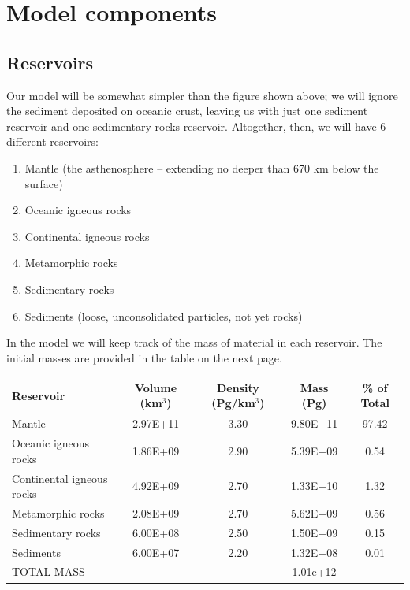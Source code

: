 \documentclass[11pt,letterpaper]{article}
\begin{document}
\section{Model components}
\subsection{Reservoirs}
Our model will be somewhat simpler than the figure shown above; we will ignore the sediment deposited on oceanic crust, leaving us with just one sediment reservoir and one sedimentary rocks reservoir. Altogether, then, we will have 6 different reservoirs:
\begin{enumerate}
\item Mantle (the asthenosphere -- extending no deeper than 670 km below the surface)
\item Oceanic igneous rocks
\item Continental igneous rocks
\item Metamorphic rocks
\item Sedimentary rocks
\item Sediments (loose, unconsolidated particles, not yet rocks)
\end{enumerate}

In the model we will keep track of the mass of material in each reservoir. The
initial masses are provided in the table on the next page.
\begin{table}[h]
\begin{tabular}{lcccc}
Reservoir & \hspace{5pt} Volume (km$^3$) \hspace{5pt}& \hspace{5pt} Density (Pg/km$^3$) \hspace{5pt} & \hspace{5pt} Mass (Pg) \hspace{5pt} & \hspace{5pt} \% of Total \hspace{5pt}\\
\hline
Mantle & 2.97E+11 & 3.30 & 9.80E+11 & 97.42\\ 
Oceanic igneous rocks & 1.86E+09 & 2.90 & 5.39E+09 & 0.54\\
Continental igneous rocks & 4.92E+09 & 2.70 & 1.33E+10 & 1.32\\
Metamorphic rocks & 2.08E+09 & 2.70 & 5.62E+09 & 0.56\\
Sedimentary rocks & 6.00E+08 & 2.50 & 1.50E+09 & 0.15\\
Sediments & 6.00E+07 & 2.20 & 1.32E+08 & 0.01\\
\hline
TOTAL MASS & & & 1.01e+12 &\\
\hline 
\end{tabular}
\end{table}
\end{document}
